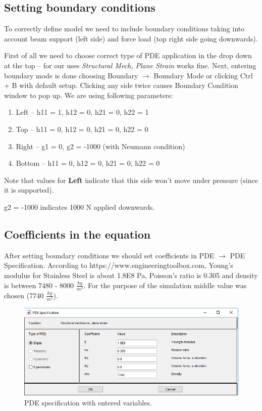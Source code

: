 \documentclass[12pt]{article}
\begin{document}
\subsection{Setting boundary conditions}

To correctly define model we need to include boundary conditions taking into account beam support (left side) and force load (top right side going downwards).

First of all we need to choose correct type of PDE application in the drop down at the top -- for our uses \textit{Structural Mech, Plane Strain} works fine. Next, entering boundary mode is done choosing Boundary $\rightarrow$ Boundary Mode or clicking Ctrl + B with default setup. Clicking any side twice causes Boundary Condition window to pop up. We are using following parameters:

\begin{enumerate}
	\item Left -- h11 = 1, h12 = 0, h21 = 0, h22 = 1
	\item Top -- h11 = 0, h12 = 0, h21 = 0, h22 = 0
	\item Right -- g1 = 0, g2 = -1000 (with Neumann condition)
	\item Bottom -- h11 = 0, h12 = 0, h21 = 0, h22 = 0
\end{enumerate}

Note that values for \textbf{Left} indicate that this side won't move under pressure (since it is supported). 

g2 = -1000 indicates 1000 N applied downwards.

\subsection{Coefficients in the equation}

After setting boundary conditions we should set coefficients in PDE $\rightarrow$ PDE Specification. According to https://www.engineeringtoolbox.com, Young's modulus for Stainless Steel is about 1.8E8 Pa, Poisson's ratio is 0.305 and density is between 7480 - 8000 $\frac{kg}{m^3}$. For the purpose of the simulation middle value was chosen (7740 $\frac{kg}{m^3}$).

\begin{figure}[H]
	\centering
	\includegraphics[width=\textwidth]{3}
	\caption{PDE specification with entered variables.}
\end{figure}
\end{document}
